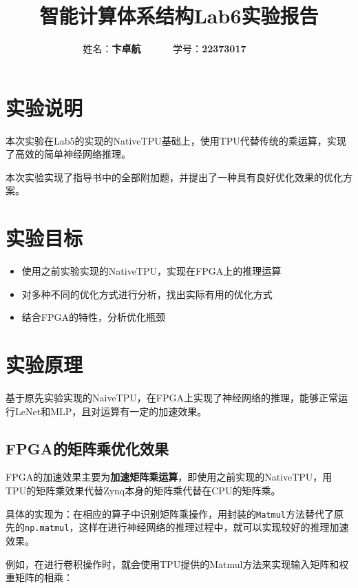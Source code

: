 \documentclass[12pt,a4paper]{article}
\begin{document}
\title{智能计算体系结构Lab6实验报告}
\date{}

\author{
姓名：\textbf{卞卓航}~~~~~~
学号：\textbf{22373017}~~~~~~
}

\maketitle

\section{实验说明}

本次实验在Lab5的实现的NativeTPU基础上，使用TPU代替传统的乘运算，实现了高效的简单神经网络推理。

本次实验实现了指导书中的全部附加题，并提出了一种具有良好优化效果的优化方案。

\section{实验目标}

\begin{itemize}
\item
  使用之前实验实现的NativeTPU，实现在FPGA上的推理运算
\item
  对多种不同的优化方式进行分析，找出实际有用的优化方式
\item
  结合FPGA的特性，分析优化瓶颈
\end{itemize}

\section{实验原理}

基于原先实验实现的NaiveTPU，在FPGA上实现了神经网络的推理，能够正常运行LeNet和MLP，且对运算有一定的加速效果。

\subsection{FPGA的矩阵乘优化效果}

FPGA的加速效果主要为\textbf{加速矩阵乘运算}，即使用之前实现的NativeTPU，用TPU的矩阵乘效果代替Zynq本身的矩阵乘代替在CPU的矩阵乘。

具体的实现为：在相应的算子中识别矩阵乘操作，用封装的\texttt{Matmul}方法替代了原先的\texttt{np.matmul}，这样在进行神经网络的推理过程中，就可以实现较好的推理加速效果。

例如，在进行卷积操作时，就会使用TPU提供的Matmul方法来实现输入矩阵和权重矩阵的相乘：
\end{document}
